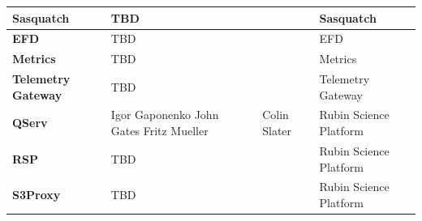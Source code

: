 \begin{longtable} {
|p{}   |p{}|p{} |p{}|}
{\textbf{Sasquatch}} & TBD &  & Sasquatch \\ \hline
{\textbf{EFD}} & TBD &  & EFD \\ \hline
{\textbf{Metrics}} & TBD &  & Metrics \\ \hline
{\textbf{Telemetry Gateway}} & TBD &  & Telemetry Gateway \\ \hline
{\textbf{QServ}} & Igor Gaponenko
 John Gates
 Fritz Mueller & Colin Slater & Rubin Science Platform \\ \hline
{\textbf{RSP}} & TBD &  & Rubin Science Platform \\ \hline
{\textbf{S3Proxy}} & TBD &  & Rubin Science Platform \\ \hline
\end{longtable}
\normalsize
